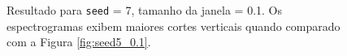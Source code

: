 \begin{figure}[ht!]
	\vspace{1mm}	
	\begin{center}
	\end{center}
	\vspace{1mm}	
	\caption{Resultado para \texttt{seed} = 7, tamanho da janela = 0.1. Os espectrogramas exibem maiores cortes verticais quando comparado com a Figura \ref{fig:seed5_0.1}.}
	\label{fig:seed7_0.1}
\end{figure}
